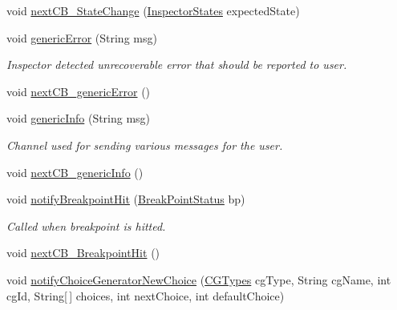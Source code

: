 \begin{DoxyCompactItemize}
void \hyperlink{classgov_1_1nasa_1_1jpf_1_1inspector_1_1client_1_1_callback_execution_decorator_a4a643ab5d0ce49b6421ff5fc0c0a4965}{next\+C\+B\+\_\+\+State\+Change} (\hyperlink{enumgov_1_1nasa_1_1jpf_1_1inspector_1_1interfaces_1_1_commands_interface_1_1_inspector_states}{Inspector\+States} expected\+State)
\item 
void \hyperlink{classgov_1_1nasa_1_1jpf_1_1inspector_1_1client_1_1_callback_execution_decorator_a96d081b7e706dc9001b1afe882da548b}{generic\+Error} (String msg)
\begin{DoxyCompactList}\small\item\em Inspector detected unrecoverable error that should be reported to user. \end{DoxyCompactList}\item 
void \hyperlink{classgov_1_1nasa_1_1jpf_1_1inspector_1_1client_1_1_callback_execution_decorator_a659914821b4cfef24cc63d8e88a20c10}{next\+C\+B\+\_\+generic\+Error} ()
\item 
void \hyperlink{classgov_1_1nasa_1_1jpf_1_1inspector_1_1client_1_1_callback_execution_decorator_a35fe87885078987820d6f26db78bcd7d}{generic\+Info} (String msg)
\begin{DoxyCompactList}\small\item\em Channel used for sending various messages for the user. \end{DoxyCompactList}\item 
void \hyperlink{classgov_1_1nasa_1_1jpf_1_1inspector_1_1client_1_1_callback_execution_decorator_a9af83f80b4a3f9eb56f569b87dbf3a1e}{next\+C\+B\+\_\+generic\+Info} ()
\item 
void \hyperlink{classgov_1_1nasa_1_1jpf_1_1inspector_1_1client_1_1_callback_execution_decorator_a06eb644c91c09d652a0d08ed9fa4de09}{notify\+Breakpoint\+Hit} (\hyperlink{interfacegov_1_1nasa_1_1jpf_1_1inspector_1_1interfaces_1_1_break_point_status}{Break\+Point\+Status} bp)
\begin{DoxyCompactList}\small\item\em Called when breakpoint is hitted. \end{DoxyCompactList}\item 
void \hyperlink{classgov_1_1nasa_1_1jpf_1_1inspector_1_1client_1_1_callback_execution_decorator_a5983e781191d6169a421a69cb40dec62}{next\+C\+B\+\_\+\+Breakpoint\+Hit} ()
\item 
void \hyperlink{classgov_1_1nasa_1_1jpf_1_1inspector_1_1client_1_1_callback_execution_decorator_ab3cf8ce30c28c335f255745daf26a18d}{notify\+Choice\+Generator\+New\+Choice} (\hyperlink{enumgov_1_1nasa_1_1jpf_1_1inspector_1_1interfaces_1_1_choice_generators_interface_1_1_c_g_types}{C\+G\+Types} cg\+Type, String cg\+Name, int cg\+Id, String\mbox{[}$\,$\mbox{]} choices, int next\+Choice, int default\+Choice)

\end{DoxyCompactItemize}
